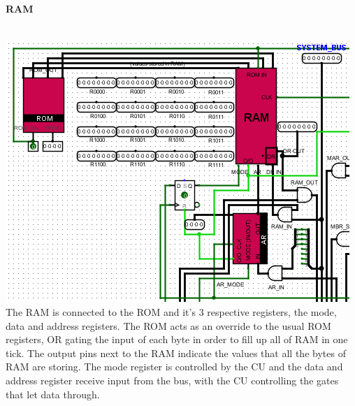 \documentclass{article}
\begin{document}
	\paragraph{RAM}~
	\\ \includegraphics[scale=0.5]{RAM} \\The RAM is connected to the ROM and it's $3$ respective registers, the mode, data and address registers. The ROM acts as an override to the usual ROM registers, OR gating the input of each byte in order to fill up all of RAM in one tick. The output pins next to the RAM indicate the values that all the bytes of RAM are storing. The mode register is controlled by the CU and the data and address register receive input from the bus, with the CU controlling the gates that let data through.
\end{document}
